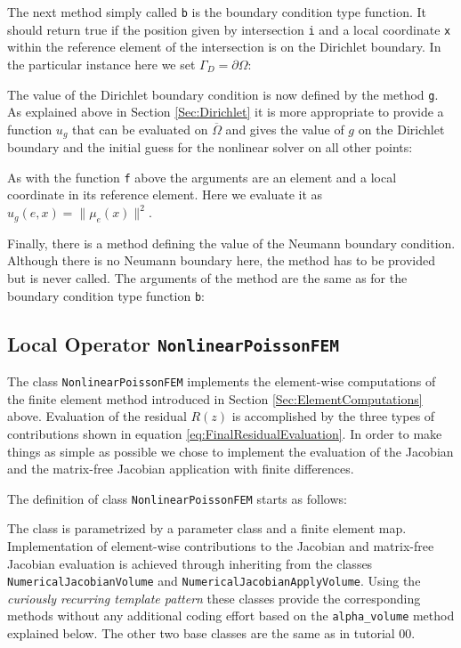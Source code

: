 \documentclass[a4paper,12pt]{article}
\begin{document}
The next method simply called \lstinline{b} is the boundary condition
type function. It should return true if the position given
by intersection \lstinline{i} and a local coordinate \lstinline{x} within
the reference element of the intersection is on the Dirichlet boundary.
In the particular instance here we set $\Gamma_D=\partial\Omega$:


The value of the Dirichlet boundary condition is now defined by the
method \lstinline{g}. As explained above in Section \ref{Sec:Dirichlet} it
is more appropriate to provide a function $u_g$ that can be evaluated
on $\overline{\Omega}$ and gives the value of $g$ on the Dirichlet boundary
and the initial guess for the nonlinear solver on all other points:

As with the function \lstinline{f} above the arguments are an element and a local coordinate
in its reference element. Here we evaluate it as $u_g(e,x) = \|\mu_e(x)\|^2$.

Finally, there is a method defining the value of the Neumann boundary condition.
Although there is no Neumann boundary here, the method has to be provided but is
never called. The arguments of the method are the same as for the boundary
condition type function \lstinline{b}:



\subsection{Local Operator \lstinline{NonlinearPoissonFEM}}

The class \lstinline{NonlinearPoissonFEM} implements the
element-wise computations of the finite element method
introduced in Section \ref{Sec:ElementComputations} above.
Evaluation of the residual $R(z)$ is accomplished
by the three types of contributions shown in equation \eqref{eq:FinalResidualEvaluation}.
In order to make things as simple as possible we chose to implement
the evaluation of the Jacobian and the matrix-free Jacobian application
with finite differences. 

The definition of class \lstinline{NonlinearPoissonFEM} starts as follows:

The class is parametrized by a parameter class and a finite element map.
Implementation of element-wise contributions to the Jacobian and matrix-free
Jacobian evaluation is achieved through inheriting from the
classes \lstinline{NumericalJacobianVolume} and \lstinline{NumericalJacobianApplyVolume}.
Using the \textit{curiously recurring template pattern} these classes provide 
the corresponding methods without any additional coding effort
based on the \lstinline{alpha_volume} method explained below.
The other two base classes are the same as in tutorial 00.
\end{document}
